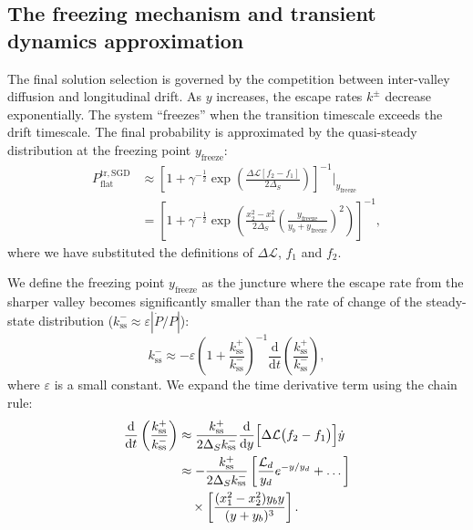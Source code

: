 \documentclass[aps,prx,reprint,superscriptaddress,longbibliography,nofootinbib,floatfix]{revtex4-2}
\begin{document}
\subsection{The freezing mechanism and transient dynamics approximation} \label{sec:appendix4}

The final solution selection is governed by the competition between inter-valley diffusion and longitudinal drift. As $y$ increases, the escape rates $k^{\pm}$ decrease exponentially. The system ``freezes'' when the transition timescale exceeds the drift timescale. The final probability is approximated by the quasi-steady distribution at the freezing point $y_\mathrm{freeze}$:
\begin{equation}
\label{eq:tr_SGD_original_a}
\begin{split}
    P_{\mathrm{flat}}^{\mathrm{tr,SGD}}
    &\approx \left[1 + \gamma^{-\frac{1}{2}} \exp\left( \frac{\Delta \mathcal{L} [f_2 - f_1]}{2 \Delta_S} \right) \right]^{-1} \bigg|_{y_\mathrm{freeze}} \\
    &= \left[1+\gamma^{-\frac{1}{2}} \exp\!\left(\frac{x_2^2-x_1^2}{2 \Delta_S} \left(\frac{y_\mathrm{freeze}}{y_b+y_\mathrm{freeze}}\right)^2\right)\right]^{-1},
\end{split}
\end{equation}
where we have substituted the definitions of $\Delta \mathcal{L}$, $f_1$ and $f_2$.

We define the freezing point $y_{\mathrm{freeze}}$ as the juncture where the escape rate from the sharper valley becomes significantly smaller than the rate of change of the steady-state distribution ($k_\mathrm{ss}^{-} \approx \varepsilon |\dot P/P|$):
\begin{equation}
 k_\mathrm{ss}^{-} \approx -\varepsilon\left(1+\frac{k_\mathrm{ss}^{+}}{k_\mathrm{ss}^{-}}\right)^{-1}\frac{\mathrm{d}}{\mathrm{d}t}\left(\frac{k_\mathrm{ss}^{+}}{k_\mathrm{ss}^{-}}\right),
    \label{eq:freezing_criterion}
\end{equation}
where $\varepsilon$ is a small constant. We expand the time derivative term using the chain rule:
\begin{equation}
\begin{split}
    \frac{\mathrm{d}}{\mathrm{d}t} \left( \frac{k_\mathrm{ss}^{+}}{k_\mathrm{ss}^{-}} \right)
    &\approx \frac{k_\mathrm{ss}^{+}}{2\Delta_S k_\mathrm{ss}^{-}} \frac{\mathrm{d}}{\mathrm{d}y}\Bigl[ \Delta\mathcal{L} \bigl( f_2-f_1 \bigr) \Bigr] \dot{y} \\
    &\approx -\frac{k_\mathrm{ss}^{+}}{2\Delta_S k_\mathrm{ss}^{-}} \left[ \frac{\mathcal{L}_d}{y_d} e^{-y/y_d} +\dots \right] \\
    &\quad \times \left[ \frac{(x_1^2-x_2^2)y_b y}{(y+y_b)^3} \right].
\end{split}
\end{equation}
\end{document}
